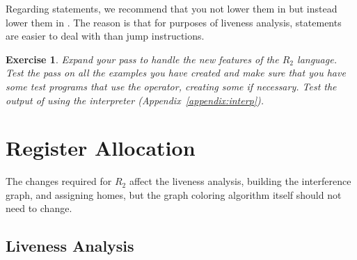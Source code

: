 \documentclass[11pt]{book}
\newtheorem{exercise}[theorem]{Exercise}
\begin{document}
Regarding  statements, we recommend that you not lower them in
 but instead lower them in
.  The reason is that for purposes of
liveness analysis,  statements are easier to deal with than
jump instructions.

\begin{exercise}\normalfont
Expand your  pass to handle the new features
of the $R_2$ language. Test the pass on all the examples you have
created and make sure that you have some test programs that use the
 operator, creating some if necessary. Test the output of
 using the  interpreter
(Appendix~\ref{appendix:interp}).
\end{exercise}

\section{Register Allocation}
\label{sec:register-allocation-r2}

The changes required for $R_2$ affect the liveness analysis, building
the interference graph, and assigning homes, but the graph coloring
algorithm itself should not need to change.

\subsection{Liveness Analysis}
\label{sec:liveness-analysis-r2}
\end{document}
